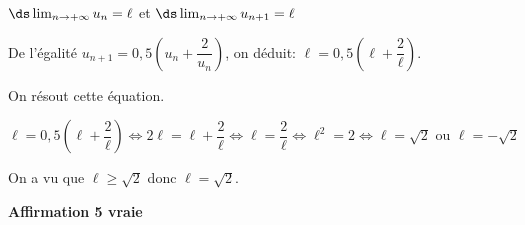 \begin{enumerate}
$\ds\lim_{n\to + \infty} u_n = \ell$ et $\ds\lim_{n\to + \infty} u_{n+1} = \ell$

De l'égalité $u_{n+1} = 0,5 \left ( u_n + \dfrac{2}{u_n} \right )$, on déduit:
$\ell = 0,5 \left ( \ell + \dfrac{2}{\ell} \right )$. 

On résout cette équation.

$\ell = 0,5 \left ( \ell + \dfrac{2}{\ell}\right )
\iff
2\ell = \ell + \dfrac{2}{\ell}
\iff
\ell=\dfrac{2}{\ell}
\iff
\ell^2=2
\iff
\ell=\sqrt{2} \text{ ou } \ell=-\sqrt{2}$

On a vu que $\ell\geqslant \sqrt{2}$ donc $\ell=\sqrt{2}$.

\hfill{\blue\bf Affirmation 5 vraie}		

\end{enumerate}
